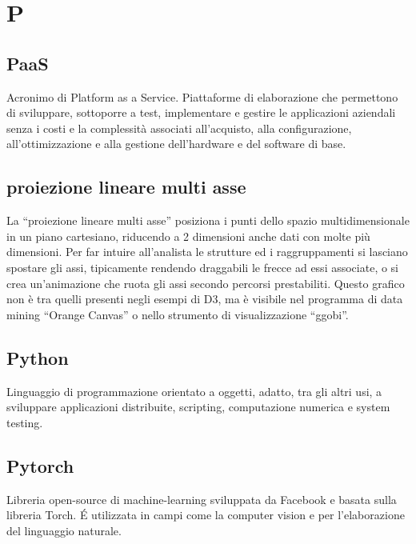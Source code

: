 \section*{P}
\markright{}
\subsection*{PaaS}
Acronimo di Platform as a Service. Piattaforme di elaborazione che permettono di sviluppare, sottoporre a test, implementare e gestire le applicazioni aziendali senza i costi e la complessità associati all'acquisto, alla configurazione, all'ottimizzazione e alla gestione dell'hardware e del software di base. 
\subsection*{proiezione lineare multi asse}
La “proiezione lineare multi asse” posiziona i punti dello spazio multidimensionale in un piano cartesiano, riducendo a 2 dimensioni anche dati con molte più dimensioni. Per far intuire all’analista le strutture ed i raggruppamenti si lasciano spostare gli assi, tipicamente rendendo draggabili le frecce ad essi associate, o si crea un’animazione che ruota gli assi secondo percorsi prestabiliti. Questo grafico non è tra quelli presenti negli esempi di D3, ma è visibile nel programma di data mining “Orange Canvas” o nello strumento di visualizzazione “ggobi”.
\subsection*{Python}
Linguaggio di programmazione orientato a oggetti, adatto, tra gli altri usi, a sviluppare applicazioni distribuite, scripting, computazione numerica e system testing.
\subsection*{Pytorch}
Libreria open-source di machine-learning sviluppata da Facebook e basata sulla libreria Torch. \'E utilizzata in campi come la computer vision e per l'elaborazione del linguaggio naturale.